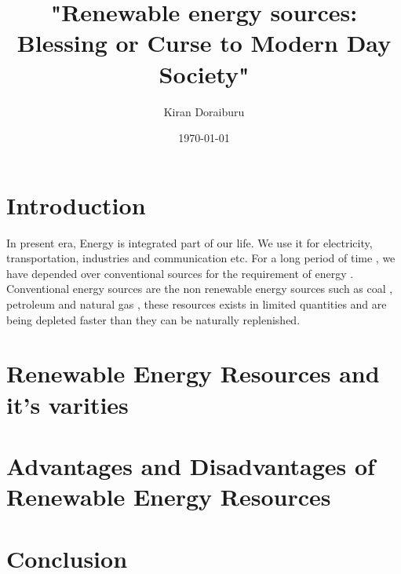 \documentclass[two column]{article}
\title{"Renewable energy sources: Blessing or Curse to Modern Day Society"}
\author{Kiran Doraiburu}
\date{\today}
\begin{document}
\maketitle

\section{Introduction}
 In present era, Energy is integrated part of our life. We use it for electricity, transportation, industries and communication etc.  
For a long period of time , we have depended over conventional sources for the requirement of energy . Conventional energy sources are the non renewable energy sources such as coal , petroleum and natural gas , these resources exists in limited quantities and are being depleted faster than they can be naturally replenished. 

\section{Renewable Energy Resources and it's varities}
\section{Advantages and Disadvantages of Renewable Energy Resources}
\section{Conclusion}
\end{document}
